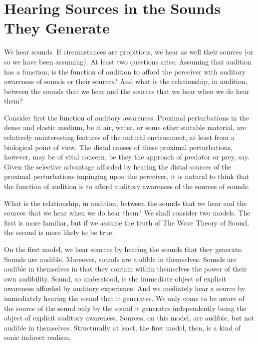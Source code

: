 \documentclass[12pt]{article}
\begin{document}

\section{Hearing Sources in the Sounds They Generate} %
\label{sec:hearing_sources_in_the_sounds_they_generate}

We hear sounds. If circumstances are propitious, we hear as well their sources (or so we have been assuming). At least two questions arise. Assuming that audition has a function, is the function of audition to afford the perceiver with auditory awareness of sounds or their sources? And what is the relationship, in audition, between the sounds that we hear and the sources that we hear when we do hear them?

Consider first the function of auditory awareness. Proximal perturbations in the dense and elastic medium, be it air, water, or some other suitable material, are relatively uninteresting features of the natural environment, at least from a biological point of view. The distal causes of these proximal perturbations, however, may be of vital concern, be they the approach of predator or prey, say. Given the selective advantage afforded by hearing the distal sources of the proximal perturbations impinging upon the perceiver, it is natural to think that the function of audition is to afford auditory awareness of the sources of sounds.

What is the relationship, in audition, between the sounds that we hear and the sources that we hear when we do hear them? We shall consider two models. The first is more familiar, but if we assume the truth of The Wave Theory of Sound, the second is more likely to be true. 

On the first model, we hear sources by hearing the sounds that they generate. Sounds are audible. Moreover, sounds are audible in themselves. Sounds are audible in themselves in that they contain within themselves the power of their own audibility. Sound, so understood, is the immediate object of explicit awareness afforded by auditory experience. And we mediately hear a source by immediately hearing the sound that it generates. We only come to be aware of the source of the sound only by the sound it generates independently being the object of explicit auditory awareness. Sources, on this model, are audible, but not audible in themselves. Structurally at least, the first model, then, is a kind of sonic indirect realism.
\end{document}
